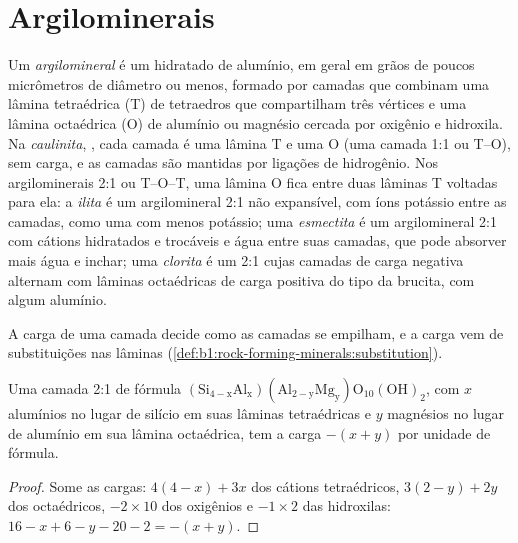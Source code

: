 \section{Argilominerais}\label{sec:b1:weathering-clays:clays}

\begin{definition}\label{def:b1:weathering-clays:clay-mineral}
Um \emph{argilomineral} é um  hidratado de alumínio, em geral em grãos de poucos micrômetros de diâmetro ou menos, formado por camadas que combinam uma lâmina tetraédrica (T) de tetraedros  que compartilham três vértices e uma lâmina octaédrica (O) de alumínio ou magnésio cercada por oxigênio e hidroxila. Na \emph{caulinita}, , cada camada é uma lâmina T e uma O (uma camada 1:1 ou T--O), sem carga, e as camadas são mantidas por ligações de hidrogênio. Nos argilominerais 2:1 ou T--O--T, uma lâmina O fica entre duas lâminas T voltadas para ela: a \emph{ilita} é um argilomineral 2:1 não expansível, com íons potássio entre as camadas, como uma  com menos potássio; uma \emph{esmectita} é um argilomineral 2:1 com cátions hidratados e trocáveis e água entre suas camadas, que pode absorver mais água e inchar; uma \emph{clorita} é um  2:1 cujas camadas de carga negativa alternam com lâminas octaédricas de carga positiva do tipo da brucita,  com algum alumínio.
\end{definition}

A carga de uma camada decide como as camadas se empilham, e a carga vem de substituições nas lâminas (\cref{def:b1:rock-forming-minerals:substitution}).

\begin{proposition}\label{prop:b1:weathering-clays:layer-charge}
Uma camada 2:1 de fórmula $\mathrm{(Si_{4-x}Al_x)(Al_{2-y}Mg_y)O_{10}(OH)_2}$, com $x$ alumínios no lugar de silício em suas lâminas tetraédricas e $y$ magnésios no lugar de alumínio em sua lâmina octaédrica, tem a carga $-(x + y)$ por unidade de fórmula.
\end{proposition}

\begin{proof}
Some as cargas: $4(4 - x) + 3x$ dos cátions tetraédricos, $3(2 - y) + 2y$ dos octaédricos, $-2\times10$ dos oxigênios e $-1\times2$ das hidroxilas: $16 - x + 6 - y - 20 - 2 = -(x + y)$.
\end{proof}

